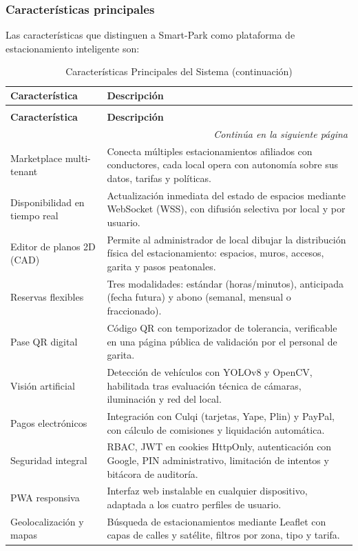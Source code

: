 \subsubsection{Características principales}

Las características que distinguen a Smart-Park como plataforma de estacionamiento inteligente son:

\begin{longtable}{p{3.5cm} p{10.5cm}}
\caption{Características Principales del Sistema} \\
\toprule
\textbf{Característica} & \textbf{Descripción} \\
\midrule
\endfirsthead

\caption[]{Características Principales del Sistema (continuación)} \\
\toprule
\textbf{Característica} & \textbf{Descripción} \\
\midrule
\endhead

\midrule
\multicolumn{2}{r}{\footnotesize\textit{Continúa en la siguiente página}} \\
\endfoot

\bottomrule
\endlastfoot

Marketplace multi-tenant & Conecta múltiples estacionamientos afiliados con conductores, cada local opera con autonomía sobre sus datos, tarifas y políticas. \\
\midrule
Disponibilidad en tiempo real & Actualización inmediata del estado de espacios mediante WebSocket (WSS), con difusión selectiva por local y por usuario. \\
\midrule
Editor de planos 2D (CAD) & Permite al administrador de local dibujar la distribución física del estacionamiento: espacios, muros, accesos, garita y pasos peatonales. \\
\midrule
Reservas flexibles & Tres modalidades: estándar (horas/minutos), anticipada (fecha futura) y abono (semanal, mensual o fraccionado). \\
\midrule
Pase QR digital & Código QR con temporizador de tolerancia, verificable en una página pública de validación por el personal de garita. \\
\midrule
Visión artificial & Detección de vehículos con YOLOv8 y OpenCV, habilitada tras evaluación técnica de cámaras, iluminación y red del local. \\
\midrule
Pagos electrónicos & Integración con Culqi (tarjetas, Yape, Plin) y PayPal, con cálculo de comisiones y liquidación automática. \\
\midrule
Seguridad integral & RBAC, JWT en cookies HttpOnly, autenticación con Google, PIN administrativo, limitación de intentos y bitácora de auditoría. \\
\midrule
PWA responsiva & Interfaz web instalable en cualquier dispositivo, adaptada a los cuatro perfiles de usuario. \\
\midrule
Geolocalización y mapas & Búsqueda de estacionamientos mediante Leaflet con capas de calles y satélite, filtros por zona, tipo y tarifa. \\
\end{longtable}

